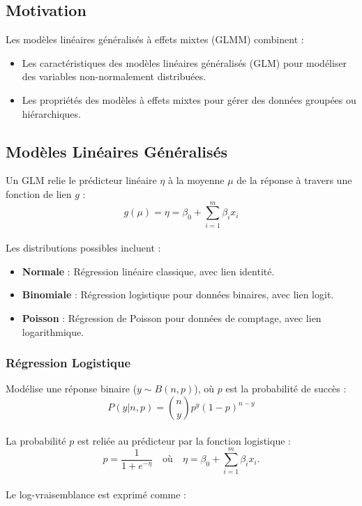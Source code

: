 \documentclass[
]{article}
\begin{document}
\subsection{Motivation}\label{motivation}

Les modèles linéaires généralisés à effets mixtes (GLMM) combinent :

\begin{itemize}
\item
  Les caractéristiques des modèles linéaires généralisés (GLM) pour
  modéliser des variables non-normalement distribuées.
\item
  Les propriétés des modèles à effets mixtes pour gérer des données
  groupées ou hiérarchiques.
\end{itemize}

\subsection{Modèles Linéaires
Généralisés}\label{moduxe8les-linuxe9aires-guxe9nuxe9ralisuxe9s}

Un GLM relie le prédicteur linéaire \(\eta\) à la moyenne \(\mu\) de la
réponse à travers une fonction de lien \(g\) :\\
\[ g(\mu) = \eta = \beta_0 + \sum_{i=1}^m \beta_i x_i \]\\
Les distributions possibles incluent :

\begin{itemize}
\item
  \textbf{Normale} : Régression linéaire classique, avec lien identité.
\item
  \textbf{Binomiale} : Régression logistique pour données binaires, avec
  lien logit.
\item
  \textbf{Poisson} : Régression de Poisson pour données de comptage,
  avec lien logarithmique.
\end{itemize}

\subsubsection{Régression Logistique}\label{ruxe9gression-logistique}

Modélise une réponse binaire (\(y \sim B(n, p)\)), où \(p\) est la
probabilité de succès :\\
\[ P(y | n, p) = \binom{n}{y} p^y (1-p)^{n-y} \]\\
La probabilité \(p\) est reliée au prédicteur par la fonction logistique
:\\
\[ p = \frac{1}{1 + e^{-\eta}} \quad \text{où} \quad \eta = \beta_0 + \sum_{i=1}^m \beta_i x_i. \]\\
Le log-vraisemblance est exprimé comme :\\
\end{document}
